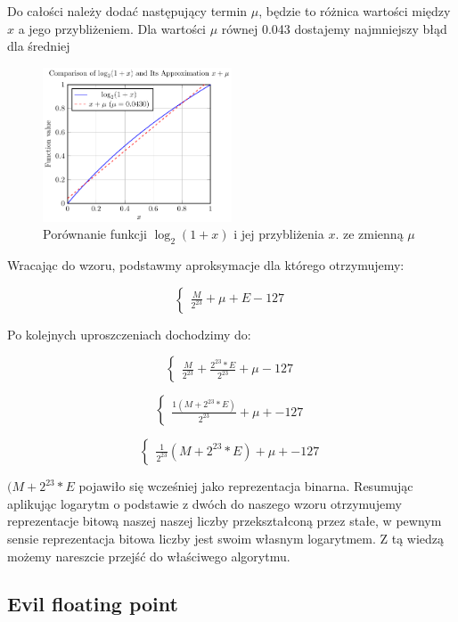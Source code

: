 \documentclass[12pt]{article}
\begin{document}
\noindent Do całości należy dodać następujący termin $\mu$, będzie to różnica wartości między $x$ a jego przybliżeniem. Dla wartości $\mu$ równej 0.043 dostajemy najmniejszy błąd dla średniej

\begin{figure}[H]  
\centering
\includegraphics[width=0.5\textwidth]{aproksymacja_mu.pdf} 
\caption{Porównanie funkcji $\log_2(1 + x)$ i jej przybliżenia $x$. ze zmienną $\mu$}
\label{fig:log_approx}
\end{figure}

\noindent Wracając do wzoru, podstawmy aproksymacje dla którego otrzymujemy:

$$ \begin{cases}
\frac{M}{2^{23}} + \mu + E-127
\end{cases} $$

\noindent Po kolejnych uproszczeniach dochodzimy do: 

$$ \begin{cases}
\frac{M}{2^{23}} + \frac{2^{23}*E}{2^{23}} + \mu - 127
\end{cases} $$

$$ \begin{cases}
\frac{1  (M + 2^{23} * E)}{2^{23}} + \mu + -127
\end{cases} $$

$$ \begin{cases}
\frac{1}{2^{23}}  (M + 2^{23} * E) + \mu + -127
\end{cases} $$

\noindent $(M + 2^{23} * E$ pojawiło się wcześniej jako reprezentacja binarna. Resumując aplikując logarytm o podstawie z dwóch do naszego wzoru otrzymujemy reprezentacje bitową naszej naszej liczby przekształconą przez stałe, w pewnym sensie reprezentacja bitowa liczby jest swoim własnym logarytmem. Z tą wiedzą możemy nareszcie przejść do właściwego algorytmu.

\subsection{Evil floating point}
\end{document}
